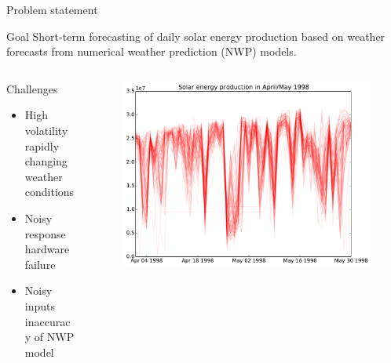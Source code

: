 \documentclass[handout]{beamer}
\begin{document}
\begin{frame}{Problem statement}
  \begin{block}{Goal}
      Short-term forecasting of daily solar energy production based on weather forecasts from numerical weather prediction (NWP) models.
  \end{block}


\begin{columns}[T]
\begin{column}{.45\textwidth}

  \begin{block}{Challenges}
      \begin{itemize}
         \item High volatility \\{\tiny rapidly changing weather conditions}

         \item Noisy response \\ {\tiny hardware failure}
         \item Noisy inputs \\ {\tiny inaccuracy of NWP model}
      \end{itemize}
  \end{block}

\end{column}
\begin{column}{.45\textwidth}
  \begin{figure}
    \includegraphics[width=\textwidth]{images/volatility.pdf}
  \end{figure}

\end{column}
\end{columns}
\end{frame}
\end{document}
